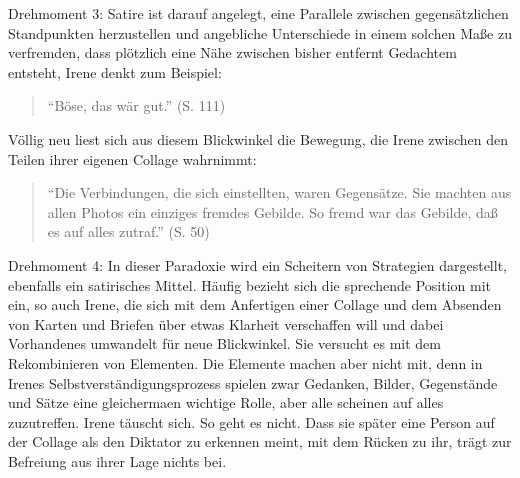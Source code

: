 \documentclass[fontsize=12pt]{scrartcl}
\begin{document}
Drehmoment 3: Satire ist darauf angelegt, eine Parallele zwischen gegens\"atzlichen Standpunkten herzustellen und angebliche Unterschiede in einem solchen Ma{\ss}e zu verfremden, dass pl\"otzlich eine N\"ahe zwischen bis\-her entfernt Gedachtem entsteht, Irene denkt zum Beispiel: 

\singlespacing
\begin{quote}
"`B\"ose, das w\"ar gut."' (S. 111)
\end{quote}
\onehalfspacing

V\"ollig neu liest sich aus diesem Blickwinkel die Bewegung, die Irene zwischen den Teilen ihrer eigenen Collage wahrnimmt: 

\singlespacing
\begin{quote}
"`Die Verbindungen, die sich einstellten, waren Gegens\"atze. Sie machten aus allen Photos ein einziges fremdes Gebilde. So fremd war das Gebilde, da{\ss} es auf alles zutraf."' (S. 50)
\end{quote}
\onehalfspacing 

Drehmoment 4: In dieser Paradoxie wird ein Scheitern von Strategien dargestellt, ebenfalls ein satirisches Mittel. H\"aufig bezieht sich die sprechende Position mit ein, so auch Irene, die sich mit dem Anfertigen einer Collage und dem Absenden von Karten und Briefen \"uber etwas Klarheit verschaffen will und dabei Vorhandenes umwandelt f\"ur neue Blickwinkel. Sie versucht es mit dem Rekombinieren von Elementen. Die Elemente machen aber nicht mit, denn in Irenes Selbst\-verst\"andigungsprozess spielen zwar Gedanken, Bilder, Gegenst\"ande und S\"atze eine glei\-cherma\-{\ss}en wichtige Rolle, aber alle scheinen auf alles zuzutreffen. Irene t\"auscht sich. So geht es nicht. Dass sie sp\"ater eine Person auf der Collage als den Diktator zu erkennen meint, mit dem R\"ucken zu ihr, tr\"agt zur Befreiung aus ihrer Lage nichts bei.
\end{document}
